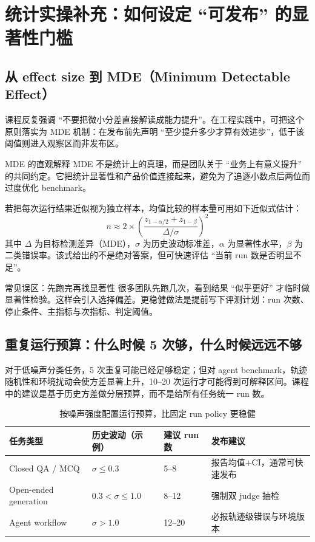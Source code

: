 \section{统计实操补充：如何设定 ``可发布'' 的显著性门槛}

\subsection{从 effect size 到 MDE（Minimum Detectable Effect）}
课程反复强调 ``不要把微小分差直接解读成能力提升''。在工程实践中，可把这个原则落实为 MDE 机制：在发布前先声明 ``至少提升多少才算有效进步''，低于该阈值则进入观察区而非发布区。

\begin{knowledgebox}{MDE 的直观解释}
MDE 不是统计上的真理，而是团队关于 ``业务上有意义提升'' 的共同约定。它把统计显著性和产品价值连接起来，避免为了追逐小数点后两位而过度优化 benchmark。
\end{knowledgebox}

若把每次运行结果近似视为独立样本，均值比较的样本量可用如下近似式估计：
\[
n \approx 2 \times \left(\frac{z_{1-\alpha/2}+z_{1-\beta}}{\Delta/\sigma}\right)^2
\]
其中 $\Delta$ 为目标检测差异（MDE），$\sigma$ 为历史波动标准差，$\alpha$ 为显著性水平，$\beta$ 为二类错误率。该式给出的不是绝对答案，但可快速评估 ``当前 run 数是否明显不足''。

\begin{warningbox}{常见误区：先跑完再找显著性}
很多团队先跑几次，看到结果 ``似乎更好'' 才临时做显著性检验。这样会引入选择偏差。更稳健做法是提前写下评测计划：run 次数、停止条件、主指标与次指标、判定阈值。
\end{warningbox}

\subsection{重复运行预算：什么时候 5 次够，什么时候远远不够}
对于低噪声分类任务，5 次重复可能已经足够稳定；但对 agent benchmark，轨迹随机性和环境扰动会使方差显著上升，10--20 次运行才可能得到可解释区间。课程中的建议是基于历史方差做分层预算，而不是给所有任务统一 run 数。

\begin{table}[H]
\centering
\begin{tabular}{p{3.0cm}p{2.8cm}p{3.4cm}p{2.9cm}}
\toprule
\textbf{任务类型} & \textbf{历史波动（示例）} & \textbf{建议 run 数} & \textbf{发布建议} \\
\midrule
Closed QA / MCQ & $\sigma \le 0.3$ & 5--8 & 报告均值+CI，通常可快速发布 \\
Open-ended generation & $0.3 < \sigma \le 1.0$ & 8--12 & 强制双 judge 抽检 \\
Agent workflow & $\sigma > 1.0$ & 12--20 & 必报轨迹级错误与环境版本 \\
\bottomrule
\end{tabular}
\caption{按噪声强度配置运行预算，比固定 run policy 更稳健}
\end{table}

